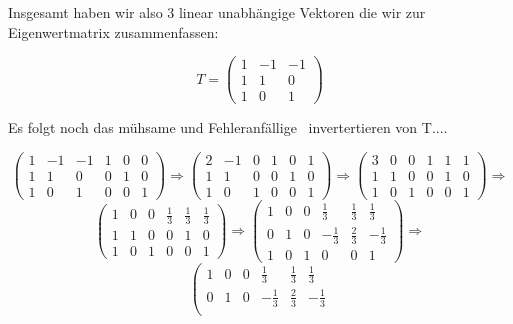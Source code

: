 \begin{uebsp}
\begin{Answer}
{
Insgesamt haben wir also 3 linear unabh\"angige Vektoren die wir zur
Eigenwertmatrix zusammenfassen:}

\begin{equation*}
T=\left(\begin{matrix}1&-1&-1\\1&1&0\\1&0&1\end{matrix}\right)
\end{equation*}


{
Es folgt noch das m\"uhsame und Fehleranf\"allige \ invertertieren von
T....}



\[
\left(\begin{array}{ccc|ccc}
1 & -1 & -1 & 1 & 0 & 0\\
1 &  1 &  0 & 0 & 1 & 0\\
1 &  0 &  1 & 0 & 0 & 1
\end{array}\right)\Rightarrow
\left(\begin{array}{ccc|ccc}
2 & -1 &  0 & 1 & 0 & 1\\
1 &  1 &  0 & 0 & 1 & 0\\
1 &  0 &  1 & 0 & 0 & 1
\end{array}\right)\Rightarrow
\left(\begin{array}{ccc|ccc}
3 & 0 &  0 & 1 & 1 & 1\\
1 &  1 &  0 & 0 & 1 & 0\\
1 &  0 &  1 & 0 & 0 & 1
\end{array}\right)\Rightarrow
\]
\[
\left(\begin{array}{ccc|ccc}
1 & 0 &  0 & \frac{1}{3} & \frac{1}{3} & \frac{1}{3}\\
1 &  1 &  0 & 0 & 1 & 0\\
1 &  0 &  1 & 0 & 0 & 1
\end{array}\right)\Rightarrow
\left(\begin{array}{ccc|ccc}
1 & 0 &  0 & \frac{1}{3} & \frac{1}{3} & \frac{1}{3}\\
0 &  1 &  0 & -\frac{1}{3} & \frac{2}{3} & -\frac{1}{3}\\
1 &  0 &  1 & 0 & 0 & 1
\end{array}\right)\Rightarrow
\]
\[
\left(\begin{array}{ccc|ccc}
1 & 0 &  0 & \frac{1}{3} & \frac{1}{3} & \frac{1}{3}\\
0 &  1 &  0 & -\frac{1}{3} & \frac{2}{3} & -\frac{1}{3}\\

\end{array}\]
\end{Answer}
\end{uebsp}
